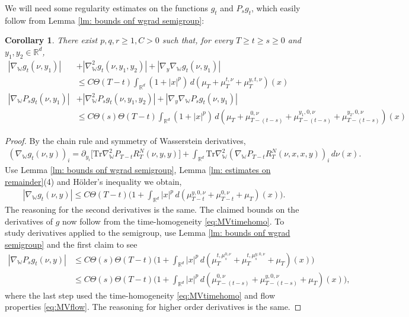 \documentclass[11pt,reqno]{amsart}
\numberwithin{equation}{section}
\newtheorem{corollary}[theorem]{Corollary}
\theoremstyle{definition}
\def\R{{\mathbb R}}
\def\tr{\mathrm{Tr}}
\newcommand{\wgrad}{\nabla_{\W}}
\newcommand{\W}{\mathbb W}
\begin{document}
We will need some regularity estimates on the functions $g_t$ and $P_sg_t$, which easily follow from Lemma \ref{lm: bounds onf wgrad semigroup}:


\begin{corollary}
\label{cr: estimates on g} 
There exist $p,q,r\geq 1, C>0$ such that, for every $T \ge t \ge s \ge 0$ and $y_1,y_2 \in \R^d$,
    \begin{align*}
    |\wgrad g_t(\nu,y_1)| &+ |\wgrad^2 g_t(\nu,y_1,y_2)| + |\nabla_y\wgrad g_t(\nu,y_1)| \\ &\leq C \Theta(T-t) \int_{\R^d}(1+|x|^p) \,d(\mu_T+\mu_T^{t,\nu}+\mu_T^{y,t,\nu})(x)  \\
    |\wgrad P_s g_t(\nu,y_1)|&+ |\wgrad^2 P_s g_t(\nu,y_1,y_2)| + |\nabla_y\wgrad P_s g_t(\nu,y_1)| \\ & \leq  C\Theta(s)\Theta(T-t)\int_{\R^d}(1+|x|^p) \,d(\mu_T+\mu_{T-(t-s)}^{0,\nu}+\mu_{T-(t-s)}^{y_1,0,\nu}+\mu_{T-(t-s)}^{y_2,0,\nu})(x) \end{align*}
\end{corollary}
\begin{proof}
    By the chain rule and symmetry of Wasserstein derivatives,
    \begin{align*}
        (\wgrad g_t(\nu,y))_i = \partial_{y_i}\big[ \tr \wgrad^2  P_{T-t} R^N_T(\nu, y,y) \big] +  \int_{\R^d}\tr \wgrad^2 (\wgrad P_{T-t}R^N_T(\nu,x,x,y))_i\,d\nu(x).
    \end{align*}
    Use Lemma \ref{lm: bounds onf wgrad semigroup}, Lemma \ref{lm: estimates on remainder}(4) and H\"older's inequality we obtain,
    \begin{align*}
        |\wgrad g_t(\nu,y)|\leq  C\Theta(T-t) \Big(1+\int_{\R^d}|x|^p\,d(\mu_{T-t}^{y,0,\nu}+\mu_{T-t}^{0,\nu}+\mu_T)(x)\Big).
    \end{align*}
    The reasoning for the second derivatives is the same. The claimed bounds on the derivatives of $g$ now follow from the time-homogeneity \eqref{eq:MVtimehomo}. To study derivatives applied to the semigroup, use Lemma \ref{lm: bounds onf wgrad semigroup} and the first claim to see
    \begin{align*}
        |\wgrad P_s g_t(\nu,y)| &\le C\Theta(s)\Theta(T-t) \Big(1+\int_{\R^d}|x|^p\,d(\mu_T^{t,\mu_s^{0,\nu}}+\mu_T^{t,\mu_s^{y,0,\nu}}+\mu_T)(x)\Big) \\
        &\le C\Theta(s)\Theta(T-t) \Big(1+\int_{\R^d}|x|^p\,d(\mu_{T-(t-s)}^{0,\nu}+\mu_{T-(t-s)}^{y,0,\nu}+\mu_T)(x)\Big),
    \end{align*}
    where the last step used the  time-homogeneity \eqref{eq:MVtimehomo} and flow properties \eqref{eq:MVflow}. The reasoning for higher order derivatives is the same.
\end{proof}
\end{document}
